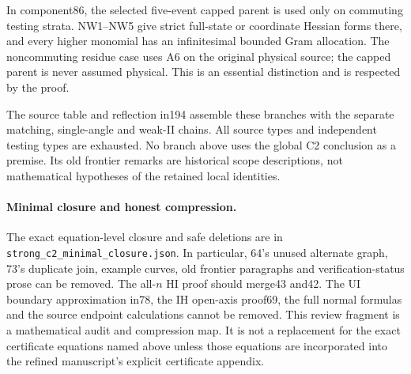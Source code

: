 In component86, the selected five-event capped parent is used only
on commuting testing strata. NW1--NW5 give strict full-state or
coordinate Hessian forms there, and every higher monomial has an
infinitesimal bounded Gram allocation. The noncommuting residue case
uses A6 on the original physical source; the capped parent is never
assumed physical. This is an essential distinction and is respected
by the proof.

The source table and reflection in194 assemble these branches with
the separate matching, single-angle and weak-II chains. All source
types and independent testing types are exhausted. No branch above
uses the global C2 conclusion as a premise. Its old frontier remarks
are historical scope descriptions, not mathematical hypotheses of
the retained local identities.

\paragraph{Minimal closure and honest compression.}
The exact equation-level closure and safe deletions are in
\texttt{strong\_c2\_minimal\_closure.json}. In particular, 64's
unused alternate graph, 73's duplicate join, example curves, old
frontier paragraphs and verification-status prose can be removed.
The all-$n$ HI proof should merge43 and42. The UI boundary
approximation in78, the IH open-axis proof69, the full normal
formulas and the source endpoint calculations cannot be removed.
This review fragment is a mathematical audit and compression map.
It is not a replacement for the exact certificate equations named
above unless those equations are incorporated into the refined
manuscript's explicit certificate appendix.
